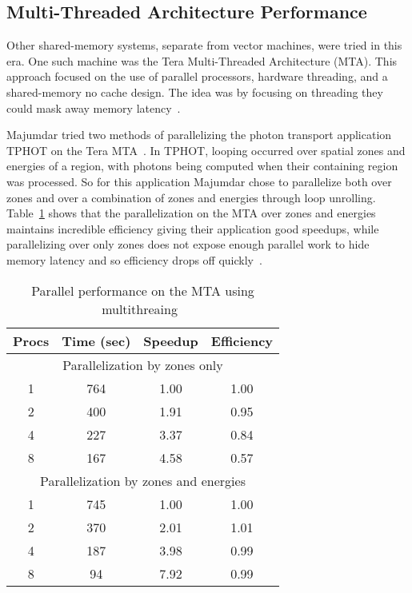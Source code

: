 \subsection*{Multi-Threaded Architecture Performance}

%
Other shared-memory systems, separate from vector machines, were tried in this era.
%
One such machine was the Tera Multi-Threaded Architecture (MTA).
%
This approach focused on the use of parallel processors, hardware threading, and a shared-memory no cache design.
%
The idea was by focusing on threading they could mask away memory latency~\cite{majumdar2000parallel, snavely1998multi}.
%

%
Majumdar tried two methods of parallelizing the photon transport application TPHOT on the Tera MTA~\cite{majumdar2000parallel}. 
%
In TPHOT, looping occurred over spatial zones and energies of a region, with photons being computed when their containing region was processed. 
%
So for this application Majumdar chose to parallelize both over zones and over a combination of zones and energies through loop unrolling.
%
Table~\ref{tab:MTAPerf} shows that the parallelization on the MTA over zones and energies maintains incredible efficiency giving their application good speedups, while parallelizing over only zones does not expose enough parallel work to hide memory latency and so efficiency drops off quickly~\cite{majumdar2000parallel}.
%
\begin{table}
\caption {Parallel performance on the MTA using multithreaing~\cite{majumdar2000parallel}} \label{tab:MTAPerf} 
\begin{center}
\begin{tabular}{|c|c|c|c|}
\hline
Procs & Time (sec) & Speedup & Efficiency \\
\hline
\multicolumn{4}{|c|}{Parallelization by zones only} \\
\hline
1 & 764 & 1.00 & 1.00 \\
\hline
2 & 400 & 1.91 & 0.95 \\
\hline
4 & 227 & 3.37 & 0.84 \\
\hline
8 & 167 & 4.58 & 0.57 \\
\hline
\multicolumn{4}{|c|}{Parallelization by zones and energies} \\
\hline
1 & 745 & 1.00 & 1.00 \\
\hline
2 & 370 & 2.01 & 1.01 \\
\hline
4 & 187 & 3.98 & 0.99 \\
\hline
8 & 94 & 7.92 & 0.99 \\
\hline
\end{tabular}
\end{center}
\end{table}

